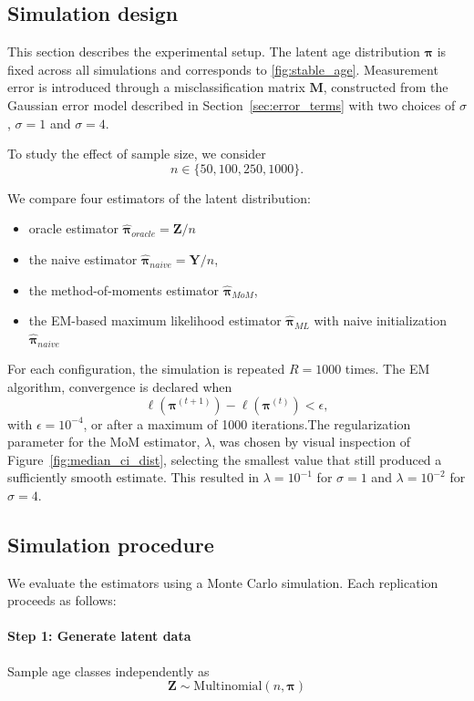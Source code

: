 \documentclass[11pt,a4paper]{article}
\begin{document}
\subsection{Simulation design}

This section describes the experimental setup. The latent age distribution $\boldsymbol{\pi}$ is fixed across all simulations and corresponds to \ref{fig:stable_age}. Measurement error is introduced through a misclassification matrix $\boldsymbol{M}$, constructed from the Gaussian error model described in Section~\ref{sec:error_terms} with two choices of $\sigma$, $\sigma = 1$ and $\sigma = 4$.

To study the effect of sample size, we consider
\[
n \in \{50, 100, 250, 1000\}.
\]

We compare four estimators of the latent distribution:
\begin{itemize}
	\item oracle estimator $\hat{\boldsymbol{\pi}}_{oracle} = \mathbf{Z}/n$
	\item the naive estimator $\hat{\boldsymbol{\pi}}_{naive} = \mathbf{Y}/n$,
	\item the method-of-moments estimator $\hat{\boldsymbol{\pi}}_{MoM}$,
	\item the EM-based maximum likelihood estimator $\hat{\boldsymbol{\pi}}_{ML}$ with naive initialization $\hat{\boldsymbol{\pi}}_{naive}$
\end{itemize}

For each configuration, the simulation is repeated $R = 1000$ times. The EM algorithm, convergence is declared when
\[
\ell(\boldsymbol{\pi}^{(t+1)}) - \ell(\boldsymbol{\pi}^{(t)}) < \epsilon,
\]
with $\epsilon = 10^{-4}$, or after a maximum of 1000 iterations.The regularization parameter for the MoM estimator, $\lambda$, was chosen by visual inspection of Figure~\ref{fig:median_ci_dist}, selecting the smallest value that still produced a sufficiently smooth estimate. This resulted in $\lambda = 10^{-1}$ for $\sigma = 1$ and $\lambda = 10^{-2}$ for $\sigma = 4$.

\subsection{Simulation procedure}
\label{sec:simulation_procedure}

We evaluate the estimators using a Monte Carlo simulation. Each replication proceeds as follows:

\paragraph{Step 1: Generate latent data}
Sample age classes independently as
\[
\boldsymbol{Z} \sim \text{Multinomial}(n,\boldsymbol{\pi})
\]
\end{document}
